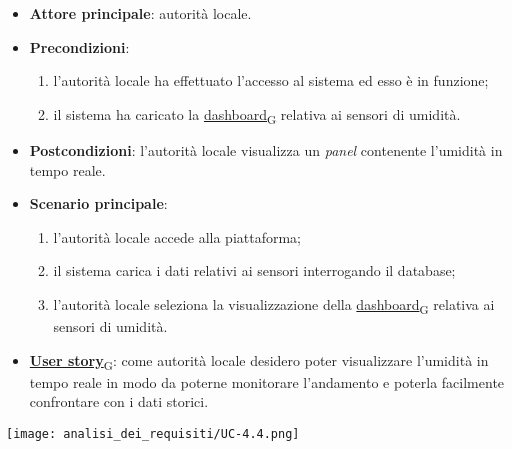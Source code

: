 \begin{itemize}
	\item \textbf{Attore principale}: autorità locale.
	\item \textbf{Precondizioni}:
	      \begin{enumerate}
		      \item l'autorità locale ha effettuato l'accesso al sistema ed esso è in funzione;
		      \item il sistema ha caricato la \href{https://7last.github.io/docs/rtb/documentazione-interna/glossario\#dashboard}{dashboard\textsubscript{G}} relativa ai sensori di umidità.
	      \end{enumerate}
	\item \textbf{Postcondizioni}: l'autorità locale visualizza un \textit{panel} contenente l'umidità in tempo reale.
	\item \textbf{Scenario principale}:
	      \begin{enumerate}
		      \item l'autorità locale accede alla piattaforma;
		      \item il sistema carica i dati relativi ai sensori interrogando il database;
		      \item l'autorità locale seleziona la visualizzazione della \href{https://7last.github.io/docs/rtb/documentazione-interna/glossario\#dashboard}{dashboard\textsubscript{G}} relativa ai sensori di umidità.
	      \end{enumerate}
	\item \href{https://7last.github.io/docs/rtb/documentazione-interna/glossario\#user-story}{\textbf{User story}\textsubscript{G}}:
	      come autorità locale desidero poter visualizzare l'umidità in tempo reale in modo da poterne monitorare l'andamento
	      e poterla facilmente confrontare con i dati storici.
\end{itemize}
\begin{center}
	\texttt{[image: analisi\_dei\_requisiti/UC-4.4.png]}
\end{center}

\newpage


